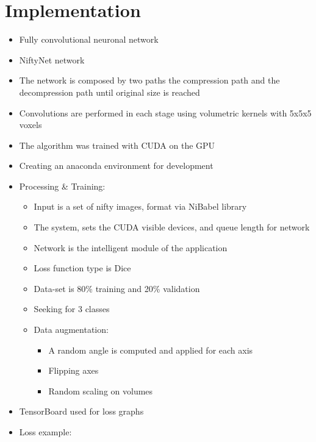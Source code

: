 \documentclass{report}
\begin{document}
\section*{Implementation}
\renewcommand{\labelitemii}{$\circ$}
\renewcommand{\labelitemiii}{\scalebox{0.5}{$\blacksquare$}}
\begin{itemize}
    \item Fully convolutional neuronal network
    \item NiftyNet network
    \item The network is composed by two paths the compression path and the decompression path until original size is reached
    \item Convolutions are performed in each stage using volumetric kernels with 5x5x5 voxels
    \item The algorithm was trained with CUDA on the GPU
    \item Creating an anaconda environment for development
    \item Processing \& Training:
    \begin{itemize}
        \item Input is a set of nifty images, format via NiBabel library
        \item The system, sets the CUDA visible devices, and queue length for network
        \item Network is the intelligent module of the application
        \item Loss function type is Dice
        \item Data-set is 80\% training and 20\% validation
        \item Seeking for 3 classes 
        \item Data augmentation:
        \begin{itemize}
            \item A random angle is computed and applied for each axis
            \item Flipping axes
            \item Random scaling on volumes
        \end{itemize}
    \end{itemize}
    \item TensorBoard used for loss graphs
    \item Loss example:
\end{itemize}
\end{document}
